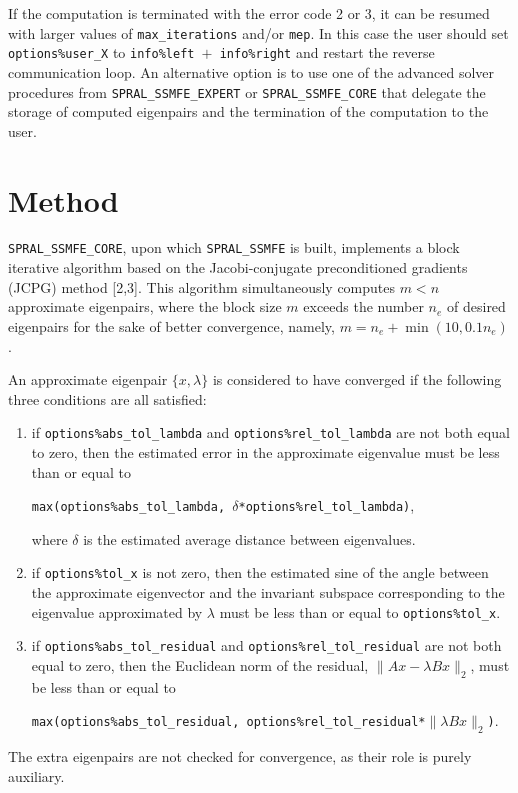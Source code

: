 If the computation is terminated with the error code 2 or 3,
it can be resumed with larger values of {\tt max\_iterations} and/or {\tt mep}.
In this case the user should set {\tt options\%user\_X} to
{\tt info\%left $+$ info\%right}
and restart the reverse communication loop.
An alternative option is to use
one of the advanced solver procedures
from \texttt{SPRAL\_SSMFE\_EXPERT} or \texttt{SPRAL\_SSMFE\_CORE}
that delegate the storage of computed eigenpairs and
the termination of the computation to the user.

\section{Method}
\label{ssmfe:method}

\texttt{SPRAL\_SSMFE\_CORE}, upon which \texttt{SPRAL\_SSMFE} is built,
implements a block iterative algorithm
based on the Jacobi-conjugate preconditioned gradients (JCPG) method [2,3].
This algorithm simultaneously computes $m < n$ approximate eigenpairs,
where the block size $m$ exceeds the number $n_e$ of desired eigenpairs
for the sake of better convergence, namely,
$m = n_e + \min(10, 0.1 n_e)$.

An approximate eigenpair 
$\{x,\lambda\}$ is considered to have converged
if %
the following three conditions are all satisfied:
%
\begin{enumerate}
%
\item
if {\tt options\%abs\_tol\_lambda} and 
{\tt options\%rel\_tol\_lambda}
are not both equal to zero, then
the estimated error in the approximate eigenvalue
must be less than or equal to

{\tt max(options\%abs\_tol\_lambda, 
$\delta$*options\%rel\_tol\_lambda)},

where $\delta$ is the estimated average distance
between eigenvalues.
\item
if {\tt options\%tol\_x} is not zero, then
the estimated sine of the angle between
the approximate eigenvector and the invariant subspace
corresponding to the eigenvalue 
approximated by $\lambda$
must be less than or equal to {\tt options\%tol\_x}.
%
\item
if {\tt options\%abs\_tol\_residual} and 
{\tt options\%rel\_tol\_residual}
are not both equal to zero, then
the Euclidean norm of the residual,
$\|A x - \lambda B x\|_2$,
must be less than or equal to

{\tt max(options\%abs\_tol\_residual, 
options\%rel\_tol\_residual*$\|\lambda B x\|_2$)}.
%
\end{enumerate}
%
The extra eigenpairs are not checked for convergence,
as their role is purely auxiliary.

